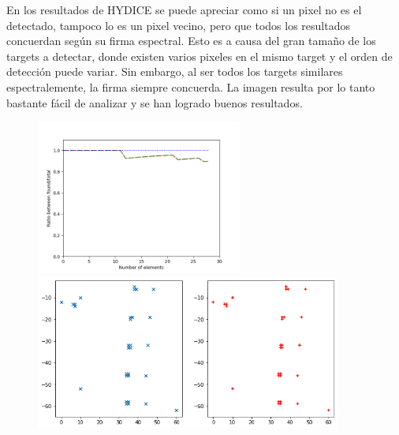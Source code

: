 En los resultados de HYDICE se puede apreciar como si un pixel no es el detectado, tampoco lo es un pixel vecino, pero que todos los resultados concuerdan según su firma espectral. Esto es a causa del gran tamaño de los targets a detectar, donde existen varios pixeles en el mismo target y el orden de detección puede variar. Sin embargo, al ser todos los targets similares espectralemente, la firma siempre concuerda. La imagen resulta por lo tanto bastante fácil de analizar y se han logrado buenos resultados.
\begin{figure}[!ht]
	\includegraphics[height=2.0in]{figures/hydice.png}
	\includegraphics[height=2.0in]{figures/hydice_res.png}
\end{figure}

